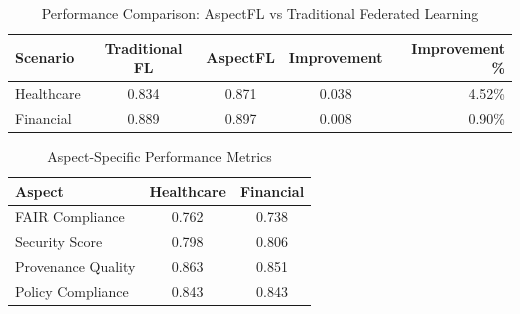 
\begin{table}[htbp]
\centering
\caption{Performance Comparison: AspectFL vs Traditional Federated Learning}
\label{tab:performance_comparison}
\begin{tabular}{lcccr}
\toprule
\textbf{Scenario} & \textbf{Traditional FL} & \textbf{AspectFL} & \textbf{Improvement} & \textbf{Improvement \%} \\
\midrule
Healthcare & 0.834 & 0.871 & 0.038 & 4.52\% \\
Financial & 0.889 & 0.897 & 0.008 & 0.90\% \\
\bottomrule
\end{tabular}
\end{table}


\begin{table}[htbp]
\centering
\caption{Aspect-Specific Performance Metrics}
\label{tab:aspect_scores}
\begin{tabular}{lcc}
\toprule
\textbf{Aspect} & \textbf{Healthcare} & \textbf{Financial} \\
\midrule
FAIR Compliance & 0.762 & 0.738 \\
Security Score & 0.798 & 0.806 \\
Provenance Quality & 0.863 & 0.851 \\
Policy Compliance & 0.843 & 0.843 \\
\bottomrule
\end{tabular}
\end{table}
